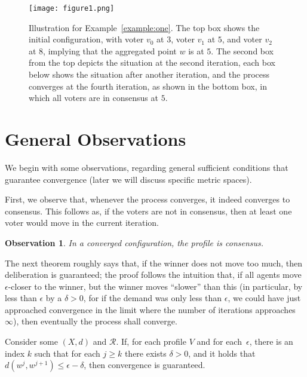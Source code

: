 \documentclass[runningheads,envcountsame]{llncs}
\newtheorem{observation}{Observation}
\begin{document}
\begin{figure}[t]
  \begin{minipage}[c]{0.67\textwidth}
\texttt{[image: figure1.png]}
  \end{minipage}\hfill
  \begin{minipage}[c]{0.3\textwidth}
    \caption{Illustration for Example~\ref{example:one}. The top box shows the initial configuration, with voter $v_0$ at $3$, voter $v_1$ at $5$, and voter $v_2$ at $8$, implying that the aggregated point $w$ is at $5$. The second box from the top depicts the situation at the second iteration, each box below shows the situation after another iteration, and the process converges at the fourth iteration, as shown in the bottom box, in which all voters are in consensus at $5$.} \label{figure:one}
  \end{minipage}
\end{figure}


\section{General Observations}\label{section:general observations}

We begin with some observations, regarding general sufficient conditions that guarantee convergence (later we will discuss specific metric spaces).

First, we observe that, whenever the process converges, it indeed converges to consensus.
%
This follows as, if the voters are not in consensus, then at least one voter would move in the current iteration.

\begin{observation}
  In a converged configuration, the profile is consensus.
\end{observation}

The next theorem roughly says that, if the winner does not move too much, then deliberation is guaranteed; the proof follows the intuition that, if all agents move $\epsilon$-closer to the winner, but the winner moves ``slower'' than this (in particular, by less than $\epsilon$ by a $\delta>0$, for if the demand was only less than $\epsilon$, we could have just approached convergence in the limit where the number of iterations approaches $\infty$), then eventually the process shall converge.
\begin{theorem}\label{theorem:one}
  Consider some $(X, d)$ and $\mathcal{R}$.
  If, for each profile $V$ and for each~$\epsilon$, there is an index $k$ such that for each $j \geq k$ there exists $\delta > 0$, and it holds that $d(w^j, w^{j+1}) \leq \epsilon - \delta$,
  then convergence is guaranteed.
\end{theorem}
\end{document}
